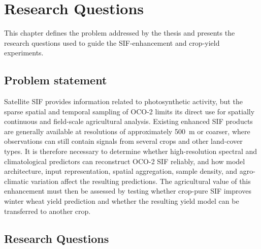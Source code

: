 \chapter{Research Questions\label{cha:chapter4}}
This chapter defines the problem addressed by the thesis and presents the research questions used to guide the SIF-enhancement and crop-yield experiments.

\section{Problem statement\label{sec:problem_statement}}
Satellite SIF provides information related to photosynthetic activity, but the sparse spatial and temporal sampling of OCO-2 limits its direct use for spatially continuous and field-scale agricultural analysis. Existing enhanced SIF products are generally available at resolutions of approximately 500~m or coarser, where observations can still contain signals from several crops and other land-cover types. It is therefore necessary to determine whether high-resolution spectral and climatological predictors can reconstruct OCO-2 SIF reliably, and how model architecture, input representation, spatial aggregation, sample density, and agro-climatic variation affect the resulting predictions. The agricultural value of this enhancement must then be assessed by testing whether crop-pure SIF improves winter wheat yield prediction and whether the resulting yield model can be transferred to another crop.

\section{Research Questions}

